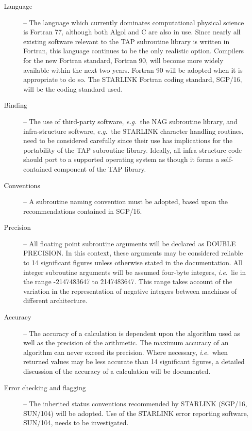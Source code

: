 \begin {description}
\item [Language] -- The language which currently dominates computational
physical science is Fortran 77, although both Algol and C are also in use.
Since nearly all existing software relevant to the TAP subroutine library
is written in Fortran, this language continues to be the only realistic option. 
Compilers for the new Fortran standard, Fortran 90, will become more widely 
available within the next two years. 
Fortran 90 will be adopted when it is appropriate to do so. 
The STARLINK Fortran coding standard, SGP/16, will be the coding standard used.

\item [Binding] -- The use of third-party software, {\em e.g.}\ the NAG
subroutine library, and infra-structure software, {\em e.g.}\ the STARLINK
character handling routines, need to be considered carefully since their
use has implications for the portability of the TAP subroutine library. 
Ideally, all infra-structure code should port to a supported operating 
system as though it forms a self-contained component of the TAP library.

\item [Conventions] -- A subroutine naming convention must be adopted, based
upon the recommendations  contained in SGP/16.

\item [Precision] -- All floating point subroutine arguments will be
declared as DOUBLE PRECISION.
In this context, these arguments may be considered reliable to 14 significant
figures unless otherwise stated in the documentation.
All integer subroutine arguments will be assumed four-byte integers, {\em
i.e.}\ lie in the range -2147483647 to 2147483647.
This range takes account of the variation in the representation of negative
integers between machines of different architecture.

\item [Accuracy] -- The accuracy of a calculation is dependent upon the
algorithm used as well as the precision of the arithmetic.
The maximum accuracy of an algorithm can never exceed its precision.
Where necessary, {\em i.e.}\ when returned values may be less accurate than
14 significant figures, a detailed discussion of the accuracy of a calculation
will be documented.

\item [Error checking and flagging] --
The inherited status conventions recommended by STARLINK (SGP/16, SUN/104)
will be adopted. 
Use of the STARLINK error reporting software, SUN/104, needs to be investigated.
\end {description}

